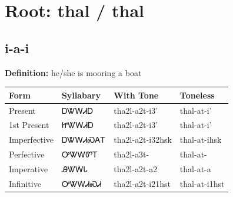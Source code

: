 \documentclass{article}%
\begin{document}
%
\normalsize%
\section*{Root: thal / thal}%
\subsection*{i-a-i}%
\textbf{Definition: }%
he/she is mooring a boat%
\\[0.5em]%
\begin{tabular}{|l|l|l|l|}%
\hline%
\textbf{Form}&\textbf{Syllabary}&\textbf{With Tone}&\textbf{Toneless}\\%
\hline%
Present&ᎠᏔᎳᏗᎠ&tha2l{-}a2t{-}i3'&thal{-}at{-}i'\\%
1st Present&ᏥᏔᎳᏗᎠ&tha2l{-}a2t{-}i3'&thal{-}at{-}i'\\%
Imperfective&ᎠᏔᎳᏗᏍᎪᎢ&tha2l{-}a2t{-}i32hsk&thal{-}at{-}ihsk\\%
Perfective&ᎤᏔᎳᏛᎢ&tha2l{-}a3t{-}&thal{-}at{-}\\%
Imperative&ᎯᏔᎳᏓ&tha2l{-}a2t{-}a2&thal{-}at{-}a\\%
Infinitive&ᎤᏔᎳᏗᏍᏗ&tha2l{-}a2t{-}i21hst&thal{-}at{-}i1hst\\%
\hline%
\end{tabular}%
\\[1em]%
\end{document}
